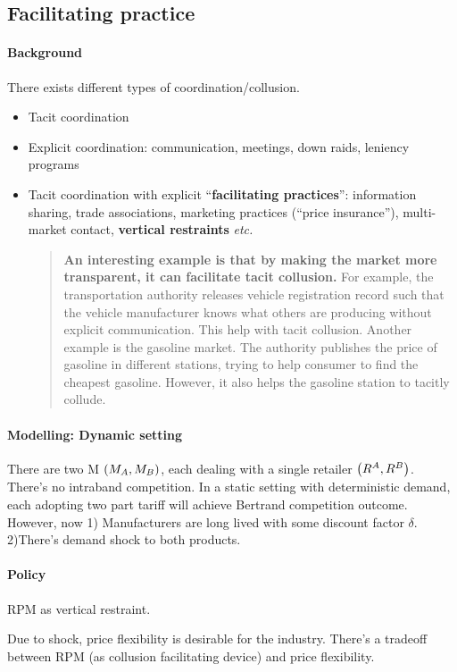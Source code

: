 \subsection{Facilitating practice}
\paragraph{Background} There exists different types of coordination/collusion. 
\begin{itemize}
    \item Tacit coordination
    \item Explicit coordination: communication, meetings, down raids, leniency programs
    \item Tacit coordination with explicit ``\textbf{facilitating practices}'': information sharing, trade associations, marketing practices (``price insurance''), multi-market contact, \textbf{vertical restraints} \emph{etc.}
    \begin{quote}
        \textbf{An interesting example is that by making the market more transparent, it can facilitate tacit collusion.} For example, the transportation authority releases vehicle registration record such that the vehicle manufacturer knows what others are producing without explicit communication. This help with tacit collusion. Another example is the gasoline market. The authority publishes the price of gasoline in different stations, trying to help consumer to find the cheapest gasoline. However, it also helps the gasoline station to tacitly collude.
    \end{quote} 
\end{itemize}
\paragraph{Modelling: Dynamic setting}
There are two M $\left(M_A,M_B\right)$, each dealing with a single retailer $\left(R^A,R^B\right)$. There's no intraband competition. In a static setting with deterministic demand, each adopting two part tariff will achieve Bertrand competition outcome. However, now 1) Manufacturers are long lived with some discount factor $\delta$. 2)There's demand shock to both products.
\paragraph{Policy} RPM as vertical restraint.
\begin{remark}
    Due to shock, price flexibility is desirable for the industry. There's a tradeoff between RPM (as collusion facilitating device) and price flexibility.
\end{remark}
